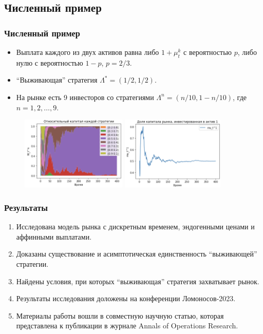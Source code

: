 \documentclass[10pt]{beamer}
\theoremstyle{definition}
\theoremstyle{remark}
\begin{document}
\subsection{Численный пример}
\begin{frame}\frametitle{Численный пример}
    \begin{itemize}
    \item Выплата каждого из двух активов равна либо $1 + \mu_{t}^k$ с вероятностью $p$, либо нулю с вероятностью $1-p$, $p=2/3$.
    \item ``Выживающая'' стратегия $\Lambda^*=(1/2, 1/2)$.
    \item На рынке есть 9 инвесторов со стратегиями $\Lambda^n = (n/10, 1-n/10)$, где $n=1,2,\dots,9$.
    \end{itemize}	

    \begin{figure}
    \centering
    \includegraphics[height=3.5cm]{pictures/pic1-relative-wealth-all.png}\quad
    \includegraphics[height=3.5cm]{pictures/pic3-mut1-fraction.png}
     \end{figure}
\end{frame}




\begin{frame}\frametitle{Результаты}
	\begin{enumerate}
		\item{Исследована модель рынка с дискретным временем, эндогенными ценами и аффинными выплатами.}
        \item{Доказаны существование и асимптотическая единственность ``выживающей'' стратегии.}
        \item{Найдены условия, при которых ``выживающая'' стратегия захватывает рынок.}
        \item{Результаты исследования доложены на конференции Ломоносов-2023.}
        \item{Материалы работы вошли в совместную научную статью, которая представлена к публикации в журнале Annals of Operations Research.}
	\end{enumerate}
\end{frame}
\end{document}
